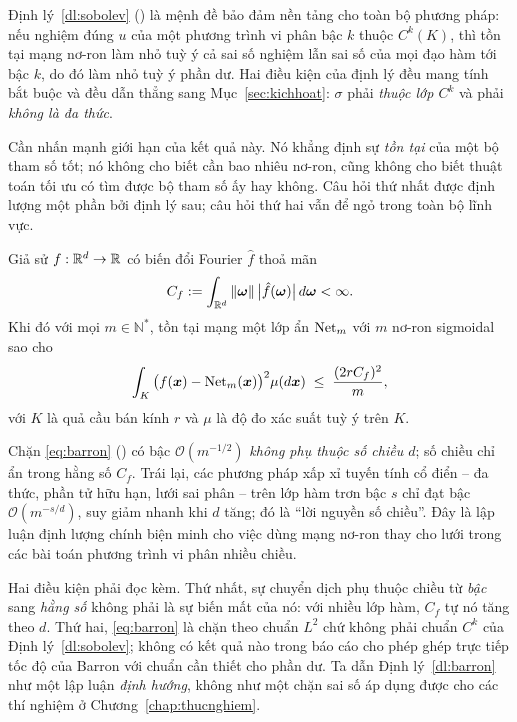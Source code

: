 Định lý~\ref{dl:sobolev} (\cite{hornik1991}) là mệnh đề bảo đảm nền tảng cho
toàn bộ phương pháp: nếu nghiệm đúng $u$ của một phương trình vi phân bậc $k$
thuộc $C^k(K)$, thì tồn tại mạng nơ-ron làm nhỏ tuỳ ý cả sai số nghiệm lẫn sai
số của mọi đạo hàm tới bậc $k$, do đó làm nhỏ tuỳ ý phần dư. Hai điều kiện của
định lý đều mang tính bắt buộc và đều dẫn thẳng sang Mục~\ref{sec:kichhoat}:
$\sigma$ phải \emph{thuộc lớp $C^k$} và phải \emph{không là đa thức}.
 
Cần nhấn mạnh giới hạn của kết quả này. Nó khẳng định sự \emph{tồn tại} của một
bộ tham số tốt; nó không cho biết cần bao nhiêu nơ-ron, cũng không cho biết
thuật toán tối ưu có tìm được bộ tham số ấy hay không. Câu hỏi thứ nhất được
định lượng một phần bởi định lý sau; câu hỏi thứ hai vẫn để ngỏ trong toàn bộ
lĩnh vực.
 
\begin{dinhly}
\label{dl:barron}
Giả sử $f : \mathbb{R}^d \to \mathbb{R}$ có biến đổi Fourier $\hat f$ thoả mãn
\begin{equation}
C_f := \int_{\mathbb{R}^d} \|\bm{\omega}\|\,\big|\hat f(\bm{\omega})\big|\,
  d\bm{\omega} < \infty .
\label{eq:barron-hang-so}
\end{equation}
Khi đó với mọi $m \in \mathbb{N}^{*}$, tồn tại mạng một lớp ẩn $\operatorname{Net}_m$ với $m$
nơ-ron sigmoidal sao cho
\begin{equation}
\int_{K} \big( f(\bm{x}) - \operatorname{Net}_m(\bm{x}) \big)^2 \mu(d\bm{x})
 \;\le\; \frac{(2 r C_f)^2}{m},
\label{eq:barron}
\end{equation}
với $K$ là quả cầu bán kính $r$ và $\mu$ là độ đo xác suất tuỳ ý trên $K$.
\end{dinhly}
 
\begin{nhanxet}
\label{nx:loi-nguyen}
Chặn \eqref{eq:barron} (\cite{barron1993}) có bậc $\mathcal{O}(m^{-1/2})$
\emph{không phụ thuộc số chiều $d$}; số chiều chỉ ẩn trong hằng số $C_f$. Trái
lại, các phương pháp xấp xỉ tuyến tính cổ điển -- đa thức, phần tử hữu hạn, lưới
sai phân -- trên lớp hàm trơn bậc $s$ chỉ đạt bậc $\mathcal{O}(m^{-s/d})$, suy
giảm nhanh khi $d$ tăng; đó là ``lời nguyền số chiều''. Đây là lập luận định
lượng chính biện minh cho việc dùng mạng nơ-ron thay cho lưới trong các bài toán
phương trình vi phân nhiều chiều.
 
Hai điều kiện phải đọc kèm. Thứ nhất, sự chuyển dịch phụ thuộc chiều từ
\emph{bậc} sang \emph{hằng số} không phải là sự biến mất của nó: với nhiều lớp
hàm, $C_f$ tự nó tăng theo $d$. Thứ hai, \eqref{eq:barron} là chặn theo chuẩn
$L^2$ chứ không phải chuẩn $C^k$ của Định lý~\ref{dl:sobolev}; không có kết quả
nào trong báo cáo cho phép ghép trực tiếp tốc độ của Barron với chuẩn cần thiết
cho phần dư. Ta dẫn Định lý~\ref{dl:barron} như một lập luận \emph{định hướng},
không như một chặn sai số áp dụng được cho các thí nghiệm ở
Chương~\ref{chap:thucnghiem}.
\end{nhanxet}
 
